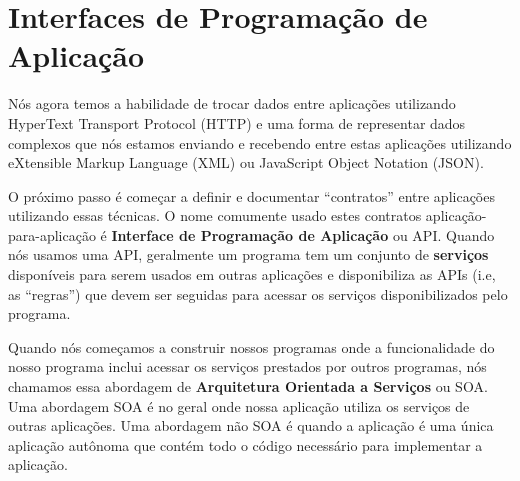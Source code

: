 \section{Interfaces de Programação de Aplicação}

Nós agora temos a habilidade de trocar dados entre aplicações utilizando 
HyperText Transport Protocol (HTTP) e uma forma de representar dados complexos
que nós estamos enviando e recebendo entre estas aplicações utilizando 
eXtensible Markup Language (XML) ou JavaScript Object Notation (JSON).

O próximo passo é começar a definir e documentar ``contratos'' entre
aplicações utilizando essas técnicas. O nome comumente usado estes
contratos aplicação-para-aplicação é {\bf Interface de Programação de 
Aplicação} ou API. Quando nós usamos uma API, geralmente um programa tem 
um conjunto de {\bf serviços} disponíveis para serem usados em outras
aplicações e disponibiliza as APIs (i.e, as ``regras'') que devem ser
seguidas para acessar os serviços disponibilizados pelo programa.

Quando nós começamos a construir nossos programas onde a funcionalidade
do nosso programa inclui acessar os serviços prestados por outros 
programas, nós chamamos essa abordagem de {\bf Arquitetura Orientada
a Serviços} ou SOA. Uma abordagem SOA é no geral onde nossa aplicação
utiliza os serviços de outras aplicações. Uma abordagem não SOA é quando
a aplicação é uma única aplicação autônoma que contém todo o código
necessário para implementar a aplicação.

